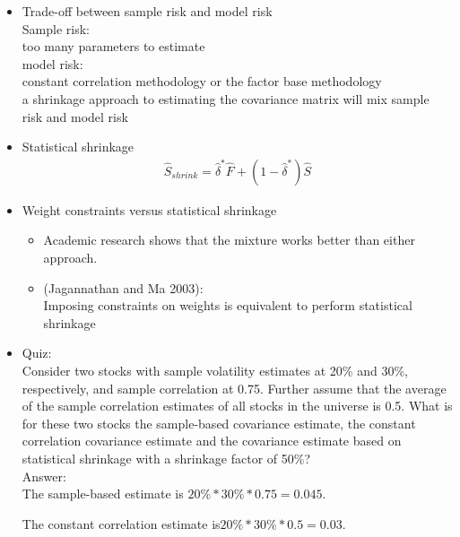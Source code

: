 \documentclass{maths}
\begin{document}
\begin{itemize}

\item Trade-off between sample risk and model risk\\

Sample risk:\\
too many parameters to estimate\\

model risk: \\
constant correlation methodology or the factor base methodology \\

a shrinkage approach to estimating the covariance matrix will mix sample risk and model risk

\item Statistical shrinkage
\begin{align*}
\hat{S}_{shrink} = \hat{\delta}^*\hat{F}+\left(1-\hat{\delta}^*\right)\hat{S}
\end{align*}

\item Weight constraints versus statistical shrinkage
\begin{itemize}

\item Academic research shows that the mixture works better than either approach.

\item (Jagannathan and Ma 2003):\\
Imposing constraints on weights is equivalent to perform statistical shrinkage\\

\end{itemize}

\item Quiz:\\
Consider two stocks with sample volatility estimates at 20\% and 30\%, respectively, and sample correlation at 0.75. Further assume that the average of the sample correlation estimates of all stocks in the universe is 0.5. What is for these two stocks the sample-based covariance estimate, the constant correlation covariance estimate and the covariance estimate based on statistical shrinkage with a shrinkage factor of 50\%?\\

Answer:\\
The sample-based estimate is $20\text{\%}*30\text{\%}*0.75=0.045$. 

The constant correlation estimate is$20\text{\%}*30\text{\%}*0.5=0.03$. 


\end{itemize}
\end{document}
